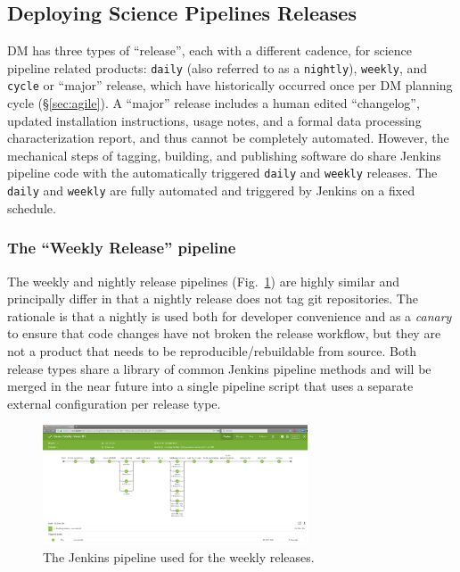 \subsection{Deploying Science Pipelines Releases}
\label{sec:scipipe-deploy}

DM has three types of ``release'', each with a different cadence, for
science pipeline related products: \texttt{daily} (also referred to as a \texttt{nightly}), \texttt{weekly}, and \texttt{cycle} or ``major'' release, which have historically occurred once per DM planning cycle (\S\ref{sec:agile}).
A ``major'' release includes a human edited ``changelog'', updated installation
instructions, usage notes, and a formal data processing characterization report,
and thus cannot be completely automated.  However, the
mechanical steps of tagging, building, and publishing software do share
Jenkins pipeline code with the automatically triggered \texttt{daily} and
\texttt{weekly} releases.
The \texttt{daily} and \texttt{weekly} are fully automated and triggered by Jenkins on a fixed
schedule.

\subsubsection{The ``Weekly Release'' pipeline}
\label{sec:releases_weekly}
\label{sec:releases_daily}

The weekly and nightly release pipelines (Fig.~\ref{fig:weekly-pipeline}) are highly similar and
principally differ in that a nightly release does not tag git
repositories.  The rationale is that a nightly is used both for
developer convenience and as a \emph{canary} to ensure that code changes have not
broken the release workflow, but they are not a product that needs to be
reproducible/rebuildable from source.
Both release types share a library of common Jenkins pipeline methods and
will be merged in the near future into a single pipeline script that uses
a separate external configuration per release type.

\begin{figure}[t]
\begin{center}
\includegraphics[width=0.7\textwidth]{pipelinedeploy-weekly-release}
\caption{The Jenkins pipeline used for the weekly releases.
\label{fig:weekly-pipeline}}
\end{center}
\end{figure}

